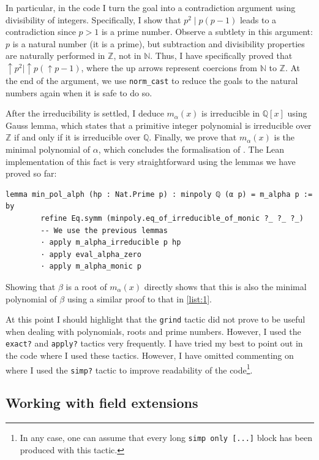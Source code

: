 \documentclass[a4paper,11pt]{article}
\theoremstyle{plain}
\newcommand{\N}{\ensuremath{\mathbb{N}}} %
\newcommand{\Q}{\ensuremath{\mathbb{Q}}} %
\newcommand{\Z}{\ensuremath{\mathbb{Z}}} %
\begin{document}
	In particular, in the code I turn the goal into a contradiction argument using divisibility of integers. Specifically, I show that $p^2\mid p(p-1)$ leads to a contradiction since $p>1$ is a prime number. Observe a subtlety in this argument: $p$ is a natural number (it is a prime), but subtraction and divisibility properties are naturally performed in $\Z$, not in $\N$. Thus, I have specifically proved that $\uparrow p^2\mid \uparrow p(\uparrow p-1)$, where the up arrows represent coercions from $\N$ to $\Z$. At the end of the argument, we use \lstinline|norm_cast| to reduce the goals to the natural numbers again when it is safe to do so.
	
	After the irreducibility is settled, I deduce $m_\alpha(x)$ is irreducible in $\Q[x]$ using Gauss lemma, which states that a primitive integer polynomial is irreducible over $\Z$ if and only if it is irreducible over $\Q$. Finally, we prove that $m_\alpha(x)$ is the minimal polynomial of $\alpha$, which concludes the formalisation of . The Lean implementation of this fact is very straightforward using the lemmas we have proved so far:\\
	
	\begin{lstlisting}[caption={Prove that $m_\alpha(x)$ is the minimal polynomial of $\alpha$.}, label={list:1}]
		lemma min_pol_alph (hp : Nat.Prime p) : minpoly ℚ (α p) = m_alpha p := by
		refine Eq.symm (minpoly.eq_of_irreducible_of_monic ?_ ?_ ?_)
		-- We use the previous lemmas
		· apply m_alpha_irreducible p hp
		· apply eval_alpha_zero
		· apply m_alpha_monic p
	\end{lstlisting}
	
	Showing that $\beta$ is a root of $m_\alpha(x)$ directly shows that this is also the minimal polynomial of $\beta$ using a similar proof to that in \cref{list:1}.
	
	At this point I should highlight that the \lstinline|grind| tactic did not prove to be useful when dealing with polynomials, roots and prime numbers. However, I used the \lstinline|exact?| and \lstinline|apply?| tactics very frequently. I have tried my best to point out in the code where I used these tactics. However, I have omitted commenting on where I used the \lstinline|simp?| tactic to improve readability of the code\footnote{In any case, one can assume that every long \lstinline|simp only [...]| block has been produced with this tactic.}.
	
	\subsection{Working with field extensions}
	
\end{document}
